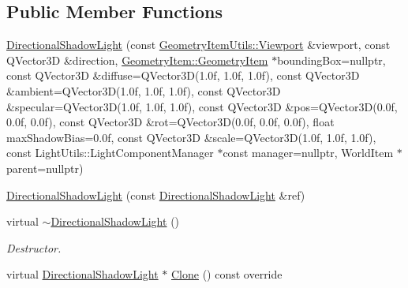 \subsection*{Public Member Functions}
\begin{DoxyCompactItemize}
\item 
\mbox{\hyperlink{class_geometry_engine_1_1_geometry_world_item_1_1_geometry_light_1_1_directional_shadow_light_a537400fc0efaad0c4b21c902b6740eeb}{Directional\+Shadow\+Light}} (const \mbox{\hyperlink{class_geometry_engine_1_1_geometry_item_utils_1_1_viewport}{Geometry\+Item\+Utils\+::\+Viewport}} \&viewport, const Q\+Vector3D \&direction, \mbox{\hyperlink{class_geometry_engine_1_1_geometry_world_item_1_1_geometry_item_1_1_geometry_item}{Geometry\+Item\+::\+Geometry\+Item}} $\ast$bounding\+Box=nullptr, const Q\+Vector3D \&diffuse=Q\+Vector3D(1.\+0f, 1.\+0f, 1.\+0f), const Q\+Vector3\+D \&ambient=\+Q\+Vector3\+D(1.\+0f, 1.\+0f, 1.\+0f), const Q\+Vector3\+D \&specular=\+Q\+Vector3\+D(1.\+0f, 1.\+0f, 1.\+0f), const Q\+Vector3\+D \&pos=\+Q\+Vector3\+D(0.\+0f, 0.\+0f, 0.\+0f), const Q\+Vector3\+D \&rot=\+Q\+Vector3\+D(0.\+0f, 0.\+0f, 0.\+0f), float max\+Shadow\+Bias=0.\+0f, const Q\+Vector3\+D \&scale=\+Q\+Vector3\+D(1.\+0f, 1.\+0f, 1.\+0f), const Light\+Utils\+::\+Light\+Component\+Manager $\ast$const manager=nullptr, World\+Item $\ast$parent=nullptr)
\item 
\mbox{\hyperlink{class_geometry_engine_1_1_geometry_world_item_1_1_geometry_light_1_1_directional_shadow_light_ad01c71215f6c7c3065f9d6dcc0ea195c}{Directional\+Shadow\+Light}} (const \mbox{\hyperlink{class_geometry_engine_1_1_geometry_world_item_1_1_geometry_light_1_1_directional_shadow_light}{Directional\+Shadow\+Light}} \&ref)
\item 
\mbox{\label{class_geometry_engine_1_1_geometry_world_item_1_1_geometry_light_1_1_directional_shadow_light_aa35bdba1338d8ba80a7d59558df8a105}} 
virtual \mbox{\hyperlink{class_geometry_engine_1_1_geometry_world_item_1_1_geometry_light_1_1_directional_shadow_light_aa35bdba1338d8ba80a7d59558df8a105}{$\sim$\+Directional\+Shadow\+Light}} ()
\begin{DoxyCompactList}\small\item\em Destructor. \end{DoxyCompactList}\item 
virtual \mbox{\hyperlink{class_geometry_engine_1_1_geometry_world_item_1_1_geometry_light_1_1_directional_shadow_light}{Directional\+Shadow\+Light}} $\ast$ \mbox{\hyperlink{class_geometry_engine_1_1_geometry_world_item_1_1_geometry_light_1_1_directional_shadow_light_ae5016cad41a62c4c870a942acc3f9afe}{Clone}} () const override
\end{DoxyCompactItemize}
